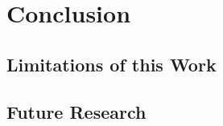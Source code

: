 

\chapter{Conclusion}\label{ch:conclusion}

\section{Limitations of this Work}


\section{Future Research}


